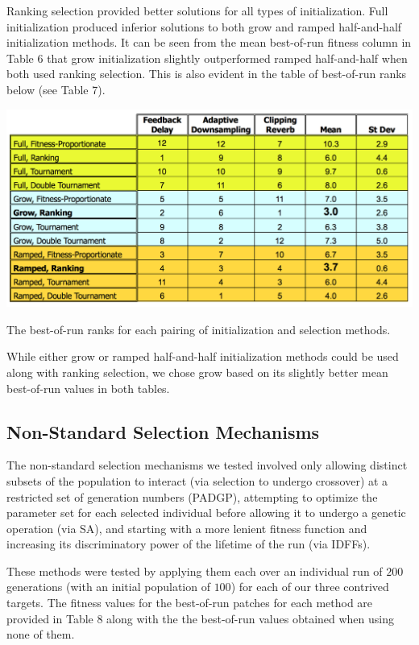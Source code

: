 \documentclass[12pt]{report} 	%
\numberwithin{figure}{chapter}
\numberwithin{table}{chapter}
\numberwithin{equation}{chapter}
\begin{document}
\begin{flushleft}
Ranking selection provided better solutions for all types of initialization. Full initialization produced inferior solutions to both grow and ramped half-and-half initialization methods. It can be seen from the mean best-of-run fitness column in Table 6 that grow initialization slightly outperformed ramped half-and-half when both used ranking selection. This is also evident in the table of best-of-run ranks below (see Table 7).
\begin{table}[h!]
\begin{center}
\includegraphics[scale=0.6,width=\linewidth]{InitializationTable2}
\caption[Initialization and selection best-of-run ranks]{The best-of-run ranks for each pairing of initialization and selection methods.}
\end{center}
\end{table}
While either grow or ramped half-and-half initialization methods could be used along with ranking selection, we chose grow based on its slightly better mean best-of-run values in both tables.

\subsection{Non-Standard Selection Mechanisms}
The non-standard selection mechanisms we tested involved only allowing distinct subsets of the population to interact (via selection to undergo crossover) at a restricted set of generation numbers (PADGP), attempting to optimize the parameter set for each selected individual before allowing it to undergo a genetic operation (via SA), and starting with a more lenient fitness function and increasing its discriminatory power of the lifetime of the run (via IDFFs).

These methods were tested by applying them each over an individual run of $200$ generations (with an initial population of $100$) for each of our three contrived targets. The fitness values for the best-of-run patches for each method are provided in Table 8 along with the the best-of-run values obtained when using none of them.


\end{flushleft}
\end{document}
